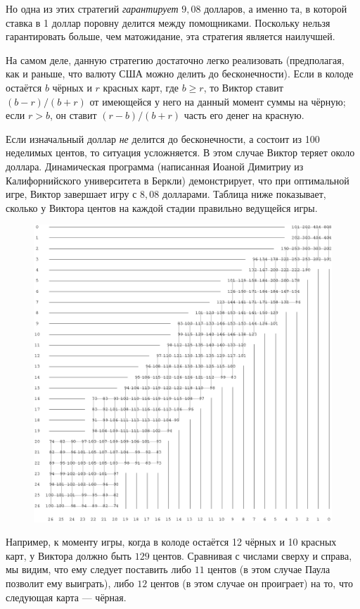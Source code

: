 Но одна из этих стратегий \emph{гарантирует} $9{,}08$ долларов, а именно та, в которой ставка в 1 доллар поровну делится между помощниками.
Поскольку нельзя гарантировать больше, чем матожидание, эта стратегия является наилучшей.\heart

На самом деле, данную стратегию достаточно легко реализовать (предполагая, как и раньше, что валюту США можно делить до бесконечности).
Если в колоде остаётся $b$ чёрных и $r$ красных карт, где $b\ge r$, то Виктор ставит $(b - r)/(b + r)$ от имеющейся у него на данный момент суммы на чёрную; если $r > b$, он ставит $(r - b)/(b + r)$ часть его денег на красную.

\medskip

Если изначальный доллар \emph{не} делится до бесконечности, а состоит из 100 неделимых центов, то ситуация усложняется.
В этом случае Виктор теряет около доллара.
Динамическая программа (написанная Иоаной Димитриу %
из Калифорнийского университета в Беркли) демонстрирует, что при оптимальной игре, Виктор завершает игру с $8{,}08$ долларами.
Таблица ниже показывает, сколько у Виктора центов на каждой стадии правильно ведущейся игры.
\begin{figure}[h!]
\centering
\includegraphics[scale=0.67]{Figs/Games/ioana}
\end{figure}
Например, к моменту игры, когда в колоде остаётся 12 чёрных и 10 красных карт, у Виктора должно быть $129$ центов. 
Сравнивая с числами сверху и справа, мы видим, что ему следует поставить либо $11$ центов (в этом случае Паула позволит ему выиграть), либо $12$ центов (в этом случае он проиграет) на то, что следующая карта --- чёрная.

